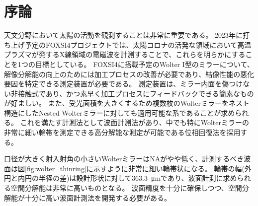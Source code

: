\documentclass[a4j]{jarticle}
\begin{document}

\section{序論}
天文分野において太陽の活動を観測することは非常に重要である。
2023年に打ち上げ予定のFOXSI4プロジェクトでは、太陽コロナの活発な領域において高温プラズマが発するX線領域の電磁波を計測することで、これらを明らかにすることを1つの目標としている。
FOXSI4に搭載予定のWolter I型のミラーについて、解像分解能の向上のためには加工プロセスの改善が必要であり、結像性能の悪化要因を特定できる測定装置が必要である。
測定装置は、ミラー内面を傷つけない非接触式であり、かつ素早く加工プロセスにフィードバックできる簡素なものが好ましい。
また、受光面積を大きくするため複数枚のWolterミラーをネスト構造にしたNested Wolterミラーに対しても適用可能な系であることが求められる。
これを満たす計測法として波面計測法があり、中でも特にWolterミラーの非常に細い輪帯を測定できる高分解能な測定が可能である位相回復法を採用する。

口径が大きく射入射角の小さいWolterミラーはNAがやや低く、計測するべき波面は図\ref{fig:wolter_thinring}に示すように非常に細い輪帯状になる。
輪帯の幅(外円と内円の半径の差)は設計形状に対して\SI{363.3}{\micro \metre}であり、波面計測に求められる空間分解能は非常に高いものとなる。
波面精度を十分に確保しつつ、空間分解能が十分に高い波面計測法を開発する必要がある。
\end{document}
